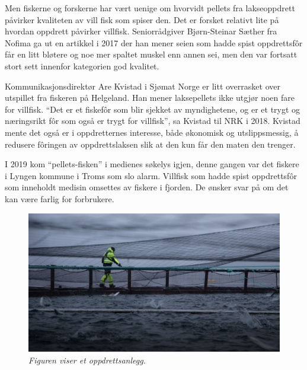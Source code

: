 Men fiskerne og forskerne har vært uenige om hvorvidt pellets fra lakseoppdrett påvirker kvaliteten av vill fisk som spiser den. Det er forsket relativt lite på hvordan oppdrett påvirker villfisk. Seniorrådgiver Bjørn-Steinar Sæther fra Nofima ga ut en artikkel i 2017 der han mener seien som hadde spist oppdrettsfôr får en litt bløtere og noe mer spaltet muskel enn annen sei, men den var fortsatt stort sett innenfor kategorien god kvalitet. \cite{Saether 2017}

Kommunikasjonsdirektør Are Kvistad i Sjømat Norge er litt overrasket over utspillet fra fiskeren på Helgeland. Han mener laksepellets ikke utgjør noen fare for villfisk. ``Det er et fiskefôr som blir sjekket av myndighetene, og er et trygt og næringsrikt fôr som også er trygt for villfisk'', sa Kvistad til NRK i 2018. Kvistad mente det også er i oppdretternes interesse, både økonomisk og utslippsmessig, å redusere fôringen av oppdrettslaksen slik at den kun får den maten den trenger. \cite{Olsen m.fl. 2018}

I 2019 kom ``pellets-fisken'' i medienes søkelys igjen, denne gangen var det fiskere i Lyngen kommune i Troms som slo alarm. Villfisk som hadde spist oppdrettsfôr som inneholdt medisin omsettes av fiskere i fjorden. De ønsker svar på om det kan være farlig for forbrukere. \cite{Trana m.fl. 2019}

\begin{figure} 
\begin{center} 
\includegraphics[scale=0.7]{figures/oppdrett}
\caption{\small \sl Figuren viser et oppdrettsanlegg. \cite{Olsen m.fl. 2018} \label{fig:anlegg}} 
\end{center} 
\end{figure} 



